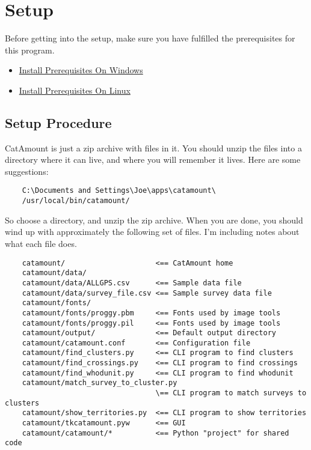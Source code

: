 \chapter{Setup}
\hypertarget{setup}{}

Before getting into the setup, make sure you have fulfilled the
prerequisites for this program.

\begin{itemize}
\item \hyperlink{prereq-windows}{Install Prerequisites On Windows}
\item \hyperlink{prereq-linux}{Install Prerequisites On Linux}
\end{itemize}

\section{Setup Procedure}

CatAmount is just a zip archive with files in it. You should unzip
the files into a directory where it can live, and where you will
remember it lives. Here are some suggestions:

\begin{verbatim}
    C:\Documents and Settings\Joe\apps\catamount\
    /usr/local/bin/catamount/
\end{verbatim}

So choose a directory, and unzip the zip archive. When you are done,
you should wind up with approximately the following set of files.
I'm including notes about what each file does.

\begin{verbatim}
    catamount/                     <== CatAmount home
    catamount/data/
    catamount/data/ALLGPS.csv      <== Sample data file
    catamount/data/survey_file.csv <== Sample survey data file
    catamount/fonts/
    catamount/fonts/proggy.pbm     <== Fonts used by image tools
    catamount/fonts/proggy.pil     <== Fonts used by image tools
    catamount/output/              <== Default output directory
    catamount/catamount.conf       <== Configuration file
    catamount/find_clusters.py     <== CLI program to find clusters
    catamount/find_crossings.py    <== CLI program to find crossings
    catamount/find_whodunit.py     <== CLI program to find whodunit
    catamount/match_survey_to_cluster.py
                                   \== CLI program to match surveys to clusters
    catamount/show_territories.py  <== CLI program to show territories
    catamount/tkcatamount.pyw      <== GUI
    catamount/catamount/*          <== Python "project" for shared code
\end{verbatim}

